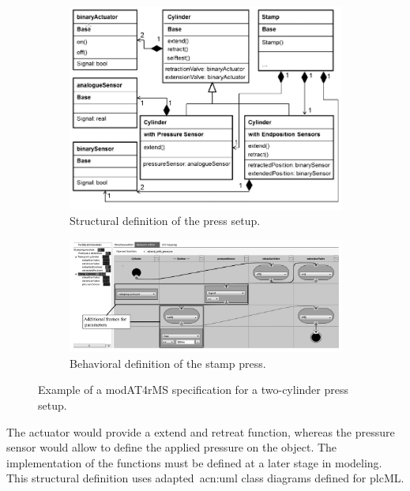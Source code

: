 \begin{figure}
	\begin{subfigure}{\textwidth}
		\includegraphics[width=\textwidth]{./Figures/modAT4rMS_struct.png}
		\caption{Structural definition of the press setup.}
		\label{fig:modAT_struct}
	\end{subfigure}
	\begin{subfigure}{\textwidth}
		\includegraphics[width=\textwidth]{./Figures/modAT4rMS_beh.png}
		\caption{Behavioral definition of the stamp press.}
		\label{fig:modAT_beh}
	\end{subfigure}
	\caption[Example of a modAT4rMS specification for a two-cylinder press setup.]{Example of a modAT4rMS specification for a two-cylinder press setup.~\cite{Obermeier:2015aa}}
	\label{fig:modAT}
\end{figure}
The actuator would provide a extend and retreat function, whereas the pressure sensor would allow to define the applied pressure on the object.
The implementation of the functions must be defined at a later stage in modeling.
This structural definition uses adapted~\acrshort{acn:uml} class diagrams defined for plcML.
